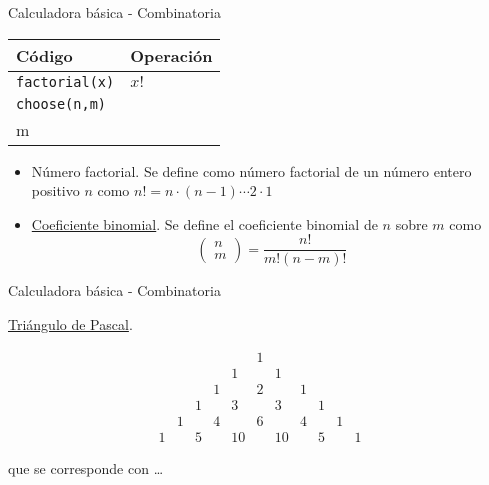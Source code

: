 \documentclass[
  ignorenonframetext,
]{beamer}
\providecommand{\tightlist}{%
  \setlength{\itemsep}{0pt}\setlength{\parskip}{0pt}}
\begin{document}
\begin{frame}[fragile]{Calculadora básica - Combinatoria}
\protect\hypertarget{calculadora-buxe1sica---combinatoria}{}

\begin{longtable}[]{@{}ll@{}}
\toprule
Código & Operación\tabularnewline
\midrule
\endhead
\texttt{factorial(x)} &
\href{https://es.wikipedia.org/wiki/Factorial}{\(x!\)}\tabularnewline
\texttt{choose(n,m)} &
\(\begin{pmatrix}n\\ m\end{pmatrix}\)\tabularnewline
\bottomrule
\end{longtable}

\vspace{0.2cm}

\begin{itemize}
\tightlist
\item
  Número factorial. Se define como número factorial de un número entero
  positivo \(n\) como \(n!=n\cdot(n-1)\cdots 2\cdot 1\)
\item
  \href{https://es.wikipedia.org/wiki/Coeficiente_binomial}{Coeficiente
  binomial}. Se define el coeficiente binomial de \(n\) sobre \(m\) como
  \[\begin{pmatrix}n\\ m\end{pmatrix}=\frac{n!}{m!(n-m)!}\]
\end{itemize}

\end{frame}

\begin{frame}{Calculadora básica - Combinatoria}
\protect\hypertarget{calculadora-buxe1sica---combinatoria-1}{}

\href{https://es.wikipedia.org/wiki/Triángulo_de_Pascal}{Triángulo de
Pascal}.

\usepackage{mathdots}
\usepackage{yhmath}
\usepackage{mathdots}
\usepackage{MnSymbol}

\[\begin{matrix}
&&&&&1&&&&&\\
&&&&1&&1&&&&\\
&&&1&&2&&1&&&\\
&&1&&3&&3&&1&&\\
&1&&4&&6&&4&&1&\\
1&&5&&10&&10&&5&&1\end{matrix}\]

que se corresponde con \ldots{}

\end{frame}
\end{document}
